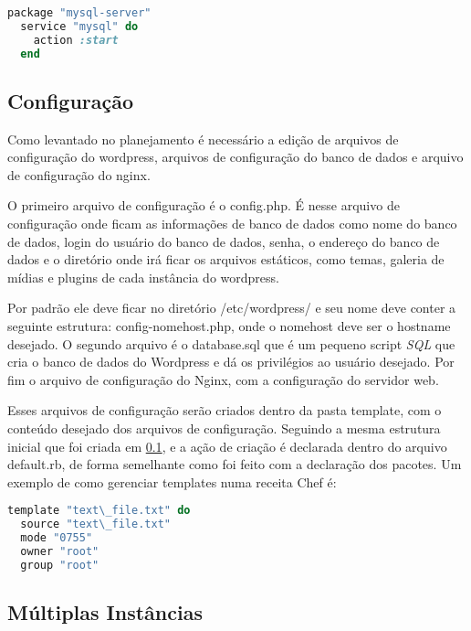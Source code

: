 \begin{lstlisting}[language=Ruby,label=dice_index,caption={Exemplo de criação de serviço do mysql com o chef}]
  package "mysql-server"
  service "mysql" do
    action :start
  end
\end{lstlisting}


\subsection{Configuração}
\label{wordpress:preparacao}

Como levantado no planejamento é necessário a edição de arquivos de configuração
do wordpress, arquivos de configuração do banco de dados e arquivo de configuração
do nginx.

O primeiro arquivo de configuração é o config.php. É nesse arquivo de
configuração onde ficam as informações de banco de dados como nome do banco de dados,
login do usuário do banco de dados, senha, o endereço do banco de dados e o diretório
onde irá ficar os arquivos estáticos, como temas, galeria de mídias e plugins 
de cada instância do wordpress.

Por padrão ele deve ficar no diretório /etc/wordpress/ e seu nome deve conter
a seguinte estrutura: config-nomehost.php, onde o nomehost deve ser o hostname
desejado. O segundo arquivo é o database.sql que é um pequeno script \textit{SQL} que
cria o banco de dados do Wordpress e dá os privilégios ao usuário desejado. Por fim
o arquivo de configuração do Nginx, com a configuração do servidor web.

Esses arquivos de configuração serão criados dentro da pasta template, com o conteúdo
desejado dos arquivos de configuração. Seguindo a mesma estrutura
inicial que foi criada em \ref{wordpress:preparacao}, e a ação de criação é
declarada dentro do arquivo default.rb, de forma semelhante como foi feito com
a declaração dos pacotes. Um exemplo de como gerenciar templates numa receita Chef
é:

\begin{lstlisting}[language=Ruby,label=dice_index,caption={Exemplo de criação de templates com o chef}]
  template "text\_file.txt" do
  source "text\_file.txt"
  mode "0755"
  owner "root"
  group "root"
\end{lstlisting}

\subsection{Múltiplas Instâncias}

